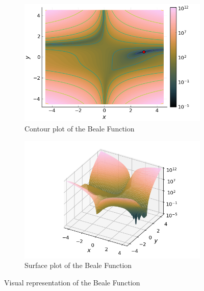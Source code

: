 \begin{figure}[ht!]
  \centering
  \begin{subfigure}[b]{0.45\textwidth}
    \centering
    \includegraphics[width=\textwidth]{img/test_functions/beale_contour.png}
    \caption{Contour plot of the Beale Function}
  \end{subfigure}
  \hfill
  \begin{subfigure}[b]{0.45\textwidth}
    \centering
    \includegraphics[width=\textwidth]{img/test_functions/beale_surface.png}
    \caption{Surface plot of the Beale Function}
  \end{subfigure}
  \caption{Visual representation of the Beale Function}
  \label{fig:beale_function}
\end{figure}
